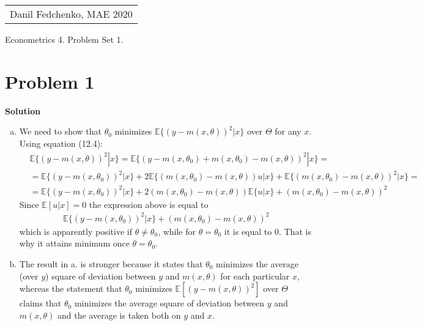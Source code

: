 \documentclass[a4paper]{article}
\newcommand{\expect}{\mathbb{E}}
\begin{document}
	\begin{flushright}
		\begin{tabular}{r}
			Danil Fedchenko, MAE 2020\\
		\end{tabular}
	\end{flushright}
	
	
	\begin{center}
		Econometrics 4. Problem Set 1.
	\end{center}
	\section*{Problem 1}
	\textbf{Solution}
	
	\begin{enumerate}[a.]
		\item We need to show that $\theta_0$ minimizes $\expect \{(y - m(x, \theta))^2|x\}$ over $\Theta$ for any $x$. Using equation (12.4):
		\begin{align*}
		&\expect \{(y - m(x, \theta))^2|x\} = \expect \{(y - m(x, \theta_0) + m(x, \theta_0) - m(x, \theta))^2|x\} =\\
		&= \expect\{(y - m(x, \theta_0))^2|x\} + 2\expect\{(m(x, \theta_0) - m(x, \theta))u|x\} + \expect\{(m(x, \theta_0) - m(x, \theta))^2|x\} = \\
		&= \expect\{(y - m(x, \theta_0))^2|x\} + 2(m(x, \theta_0) - m(x, \theta))\expect\{u|x\} + (m(x, \theta_0) - m(x, \theta))^2
		\end{align*}
		Since $\expect[u|x] = 0$ the expression above is equal to
		\begin{align*}
		\expect\{(y - m(x, \theta_0))^2|x\} + (m(x, \theta_0) - m(x, \theta))^2
		\end{align*}
		which is apparently positive if $\theta \neq \theta_0$, while for $\theta = \theta_0$ it is equal to 0. That is why it attains minimum once $\theta = \theta_0$.
		\item The result in a. is stronger because it states that $\theta_0$ minimizes the average (over $y$) square of deviation between $y$ and $m(x, \theta)$ for each particular $x$, whereas the statement that $\theta_0$ minimizes $\expect[(y - m(x, \theta))^2]$ over $\Theta$ claims that $\theta_0$ minimizes the average square of deviation between $y$ and $m(x, \theta)$ and the average is taken both on $y$ and $x$.
	\end{enumerate}
\end{document}
